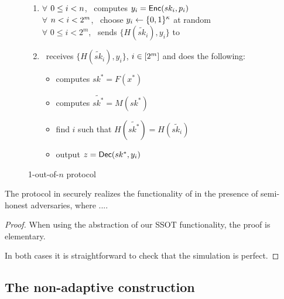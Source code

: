 \begin{figure}[h]
{\begin{minipage}{0.95\linewidth}
\begin{enumerate}
				\item  $\forall$ $0\leq i < n$, \SS\ computes $y_i = \mathsf{Enc}(sk_i, p_i)$
				 \\$\forall$ $n < i < 2^m$, \SS\ choose $y_i \leftarrow\{0,1\}^\kappa$ at random
				 \\ $\forall$ $0\leq i < 2^m$, \SS\ sends $\{H(\tilde{sk}_{i}), y_i\}$ to \RR\
				\item \RR\ receives $\{H(\tilde{sk}_{i}), y_i\}$, $i\in[2^{m}]$ and does the following: 
				\begin{itemize}
					\item computes $sk^* = F(x^*)$
					\item computes $\tilde{sk^*} = M(sk^*)$
					\item find $i$ such that $H(\tilde{sk^*})= H(\tilde{sk_i})$
					\item output $z=\mathsf{Dec}(sk^*, y_i)$
				\end{itemize}
				
			
			\end{enumerate}
			
			
		\end{minipage}
	}
	\caption{1-out-of-$n$ \SSOT protocol}
	\label{fig:Cons1ssot}
\end{figure}





\begin{theorem}
\label{thm:sot}
The \SSOT protocol in  securely realizes the  functionality of  in the presence of semi-honest adversaries, where ....
\end{theorem}


\begin{proof}
%
When using the abstraction of our SSOT functionality, the proof is elementary.

In both cases it is straightforward to check that the simulation is perfect.
\end{proof}

\subsection{The non-adaptive \SSOT construction}
\label{sect:constrnSSOT}
 